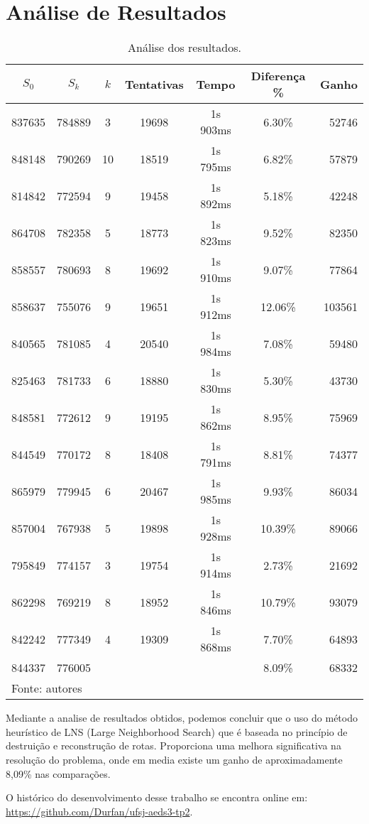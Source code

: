 \documentclass[12pt,a4paper]{article}
\renewcommand*{\arraystretch}{1.2}
\numberwithin{figure}{section}
\numberwithin{table}{section}
\begin{document}
\section{Análise de Resultados}

\begin{table}[H]
	\renewcommand{\arraystretch}{1}
	\centering
	\caption{Análise dos resultados.}
	\label{tab:resultados}
	\begin{tabular}{*{6}{c} r}
		\toprule 
		$S_{0}$ & $S_{k}$ & $k$ & Tentativas & Tempo & Diferença \% & Ganho \\ 
		\midrule
		837635 & 784889 &  3 & 19698 & 1s 903ms &  6.30\% &  52746 \\
		848148 & 790269 & 10 & 18519 & 1s 795ms &  6.82\% &  57879 \\
		814842 & 772594 &  9 & 19458 & 1s 892ms &  5.18\% &  42248 \\
		864708 & 782358 &  5 & 18773 & 1s 823ms &  9.52\% &  82350 \\
		858557 & 780693 &  8 & 19692 & 1s 910ms &  9.07\% &  77864 \\
		858637 & 755076 &  9 & 19651 & 1s 912ms & 12.06\% & 103561 \\
		840565 & 781085 &  4 & 20540 & 1s 984ms &  7.08\% &  59480 \\
		825463 & 781733 &  6 & 18880 & 1s 830ms &  5.30\% &  43730 \\
		848581 & 772612 &  9 & 19195 & 1s 862ms &  8.95\% &  75969 \\
		844549 & 770172 &  8 & 18408 & 1s 791ms &  8.81\% &  74377 \\
		865979 & 779945 &  6 & 20467 & 1s 985ms &  9.93\% &  86034 \\
		857004 & 767938 &  5 & 19898 & 1s 928ms & 10.39\% &  89066 \\
		795849 & 774157 &  3 & 19754 & 1s 914ms &  2.73\% &  21692 \\
		862298 & 769219 &  8 & 18952 & 1s 846ms & 10.79\% &  93079 \\
		842242 & 777349 &  4 & 19309 & 1s 868ms &  7.70\% &  64893 \\
		\midrule
		844337 & 776005 &    &       &          &  8.09\% &  68332 \\
		\bottomrule
		\multicolumn{6}{l}{\footnotesize Fonte: autores}
	\end{tabular}
\end{table}

Mediante a analise de resultados obtidos, podemos concluir que o uso do método heurístico de LNS (Large Neighborhood Search) que é baseada no princípio de destruição e reconstrução de rotas. Proporciona uma melhora significativa na resolução do problema, onde em media existe um ganho de aproximadamente 8,09\% nas comparações.

\pagebreak

\begin{flushleft}
	\nocite{*}
	
	\vfill
	O histórico do desenvolvimento desse trabalho se encontra online em:\\ \url{https://github.com/Durfan/ufsj-aeds3-tp2}.
\end{flushleft}
\end{document}
